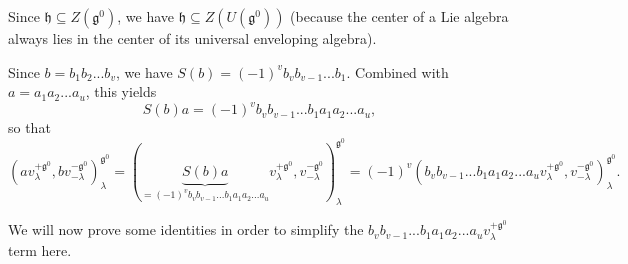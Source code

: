 \documentclass[etingof-lie.tex]{subfiles}
\begin{document}
Since $\mathfrak{h}\subseteq Z\left(  \mathfrak{g}^{0}\right)  $, we have
$\mathfrak{h}\subseteq Z\left(  U\left(  \mathfrak{g}^{0}\right)  \right)  $
(because the center of a Lie algebra always lies in the center of its
universal enveloping algebra).

Since $b=b_{1}b_{2}...b_{v}$, we have $S\left(  b\right)  =\left(  -1\right)
^{v}b_{v}b_{v-1}...b_{1}$. Combined with $a=a_{1}a_{2}...a_{u}$, this yields%
\[
S\left(  b\right)  a=\left(  -1\right)  ^{v}b_{v}b_{v-1}...b_{1}a_{1}%
a_{2}...a_{u},
\]
so that%
\begin{equation}
\left(  av_{\lambda}^{+\mathfrak{g}^{0}},bv_{-\lambda}^{-\mathfrak{g}^{0}%
}\right)  _{\lambda}^{\mathfrak{g}^{0}}=\left(  \underbrace{S\left(  b\right)
a}_{=\left(  -1\right)  ^{v}b_{v}b_{v-1}...b_{1}a_{1}a_{2}...a_{u}}v_{\lambda
}^{+\mathfrak{g}^{0}},v_{-\lambda}^{-\mathfrak{g}^{0}}\right)  _{\lambda
}^{\mathfrak{g}^{0}}=\left(  -1\right)  ^{v}\left(  b_{v}b_{v-1}...b_{1}%
a_{1}a_{2}...a_{u}v_{\lambda}^{+\mathfrak{g}^{0}},v_{-\lambda}^{-\mathfrak{g}%
^{0}}\right)  _{\lambda}^{\mathfrak{g}^{0}}. \label{prop.det.US.pf.4}%
\end{equation}


We will now prove some identities in order to simplify the $b_{v}%
b_{v-1}...b_{1}a_{1}a_{2}...a_{u}v_{\lambda}^{+\mathfrak{g}^{0}}$ term here.
\end{document}
